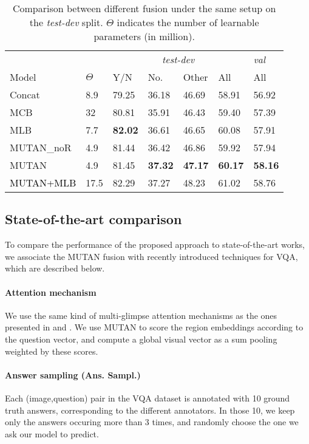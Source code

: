 \documentclass[10pt,twocolumn,letterpaper]{article}
\begin{document}
\begin{table}[]
\begin{tabularx}{\columnwidth}{lX*{4}{X}X}
&&\multicolumn{4}{c}{\textit{test-dev}} & \textit{val} \\
\cmidrule{3-6} \cmidrule{7-7}
Model & $\Theta$ & Y/N & No. & Other & All & All\\ 
\hline
Concat & 8.9 & 79.25 & 36.18 & 46.69 & 58.91 & 56.92\\ 
MCB & 32 & 80.81 & 35.91 & 46.43 & 59.40 & 57.39 \\ 
 MLB & 7.7 & \textbf{82.02} & 36.61 & 46.65 & 60.08 & 57.91\\ 
 MUTAN\_noR & 4.9 & 81.44 & 36.42 & 46.86 & 59.92 & 57.94\\ 
MUTAN & 4.9 & 81.45 & \textbf{37.32} & \textbf{47.17} & \textbf{60.17} & \textbf{58.16}\\
\hline
\hline
\textcolor{black}{MUTAN+MLB} & 17.5 & 82.29 & 37.27 & 48.23 & 61.02 & 58.76 \\

\bottomrule
\end{tabularx}
\caption{\label{fusion_compare:testdev} Comparison between different fusion under the same setup on the \textit{test-dev} split. $\Theta$ indicates the number of learnable parameters (in million).}  
\end{table}

\subsection{State-of-the-art comparison} 
\label{final_system}


To compare the performance of the proposed approach to state-of-the-art works, we associate the MUTAN fusion with recently introduced techniques for VQA, which are described below.

\vspace{-0.4cm}
\paragraph{Attention mechanism}
We use the same kind of multi-glimpse attention mechanisms as the ones presented in \cite{fukui16mcb} and \cite{Kim2017}. We use MUTAN to score the region embeddings according to the question vector, and compute a global visual vector as a sum pooling weighted by these scores.
\vspace{-0.4cm}
\paragraph{Answer sampling (Ans. Sampl.)}
Each (image,question) pair in the VQA dataset is annotated with 10 ground truth answers, corresponding to the different annotators. In those 10, we keep only the answers occuring more than 3 times, and randomly choose the one we ask our model to predict. 
\vspace{-0.4cm}
\end{document}

